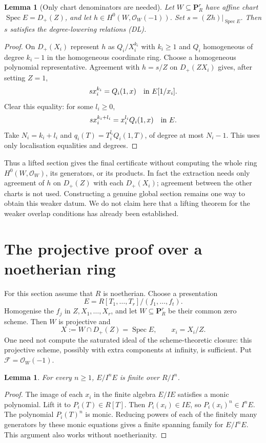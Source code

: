 \documentclass[11pt]{amsart}
\newtheorem{lemma}[theorem]{Lemma}
\theoremstyle{definition}
\theoremstyle{remark}
\DeclareMathOperator{\Spec}{Spec}
\newcommand{\OO}{\mathcal O}
\newcommand{\FF}{\mathcal F}
\newcommand{\PP}{\mathbf P}
\begin{document}
\begin{lemma}[Only chart denominators are needed]\label{lem:denom}
Let $W\subseteq\PP^r_R$ have affine chart $\Spec E=D_+(Z)$, and let
$h\in H^0(W,\OO_W(-1))$. Set $s=(Zh)|_{\Spec E}$. Then $s$ satisfies
the degree-lowering relations (DL).
\end{lemma}
\begin{proof}
On $D_+(X_i)$ represent $h$ as $Q_i/X_i^{k_i}$ with $k_i\geq1$
and $Q_i$ homogeneous of degree $k_i-1$ in the homogeneous
coordinate ring. Choose a homogeneous polynomial representative.
Agreement with $h=s/Z$ on $D_+(ZX_i)$ gives, after setting $Z=1$,
\[
 s x_i^{k_i}=Q_i(1,x)\quad\hbox{in }E[1/x_i].
\]
Clear this equality: for some $l_i\geq0$,
\[
 s x_i^{k_i+l_i}=x_i^{l_i}Q_i(1,x)\quad\hbox{in }E.
\]
Take $N_i=k_i+l_i$ and $q_i(T)=T_i^{l_i}Q_i(1,T)$, of degree
at most $N_i-1$. This uses only localisation equalities and degrees.
\end{proof}

Thus a lifted section gives the final certificate without computing
the whole ring $H^0(W,\OO_W)$, its generators, or its products. In
fact the extraction needs only agreement of $h$ on $D_+(Z)$ with
each $D_+(X_i)$; agreement between the other charts is not used.
Constructing a genuine global section remains one way to obtain this
weaker datum. We do not claim here that a lifting theorem for the
weaker overlap conditions has already been established.

\section{The projective proof over a noetherian ring}

For this section assume that $R$ is noetherian. Choose a presentation
\[
 E=R[T_1,\ldots,T_r]/(f_1,\ldots,f_t).
\]
Homogenise the $f_j$ in
$Z,X_1,\ldots,X_r$, and let $W\subseteq\PP^r_R$ be their common zero
scheme. Then $W$ is projective and
\[
 X:=W\cap D_+(Z)=\Spec E,\qquad x_i=X_i/Z.
\]
One need not compute the saturated ideal of the scheme-theoretic
closure: this projective scheme, possibly with extra components at
infinity, is sufficient. Put $\FF=\OO_W(-1)$.

\begin{lemma}\label{lem:nilpotent}
For every $n\geq1$, $E/I^nE$ is finite over $R/I^n$.
\end{lemma}
\begin{proof}
The image of each $x_i$ in the finite algebra $E/IE$ satisfies a monic
polynomial. Lift it to $P_i(T)\in R[T]$. Then $P_i(x_i)\in IE$, so
$P_i(x_i)^n\in I^nE$. The polynomial $P_i(T)^n$ is monic. Reducing
powers of each of the finitely many generators by these monic equations
gives a finite spanning family for $E/I^nE$. This argument also works
without noetherianity.
\end{proof}
\end{document}

